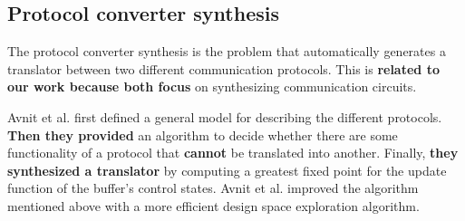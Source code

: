 \documentclass[journal]{IEEEtran}
\begin{document}
{%
%
%
%
%
%
%


\subsection{Protocol converter synthesis}
The protocol converter synthesis is the problem that automatically generates a translator between two different communication protocols.
This is \textbf{related to our work because both focus} on synthesizing communication circuits.

Avnit et al. \cite{converter_date08,converter_todeas09} first defined a general model for describing the different protocols.
\textbf{Then they provided} an algorithm to decide
whether there are some functionality of a protocol that \textbf{cannot} be translated into another.
Finally,
\textbf{they synthesized a translator} by computing a greatest fixed point for the update function of the buffer's control states.
Avnit et al.\cite{converter_date09} improved the algorithm mentioned above with a more efficient design space exploration algorithm.

}
\end{document}

